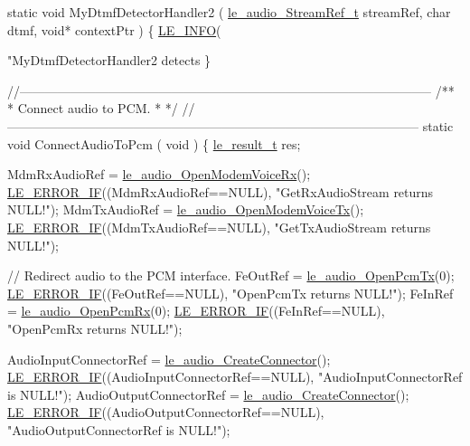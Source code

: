 \begin{DoxyCodeInclude}
{{{\textcolor{keyword}{static} \textcolor{keywordtype}{void} MyDtmfDetectorHandler2
(
    \hyperlink{le__audio__interface_8h_a9a46ff5a5afa61f1bc76120ab9e4da0a}{le\_audio\_StreamRef\_t} streamRef,
    \textcolor{keywordtype}{char}  dtmf,
    \textcolor{keywordtype}{void}* contextPtr
)
\{
    \hyperlink{le__log_8h_a23e6d206faa64f612045d688cdde5808}{LE\_INFO}(\textcolor{stringliteral}{"MyDtmfDetectorHandler2 detects %
\}

\textcolor{comment}{//--------------------------------------------------------------------------------------------------}\textcolor{comment}{}
\textcolor{comment}{/**}
\textcolor{comment}{ * Connect audio to PCM.}
\textcolor{comment}{ *}
\textcolor{comment}{ */}
\textcolor{comment}{//--------------------------------------------------------------------------------------------------}
\textcolor{keyword}{static} \textcolor{keywordtype}{void} ConnectAudioToPcm
(
    \textcolor{keywordtype}{void}
)
\{
    \hyperlink{le__basics_8h_a1cca095ed6ebab24b57a636382a6c86c}{le\_result\_t} res;

    MdmRxAudioRef = \hyperlink{le__audio__interface_8h_ae3ed568ba4d2763ea77e17e77b20ff02}{le\_audio\_OpenModemVoiceRx}();
    \hyperlink{le__log_8h_aceaf11a11691d6c676e36dd317b38dbd}{LE\_ERROR\_IF}((MdmRxAudioRef==NULL), \textcolor{stringliteral}{"GetRxAudioStream returns NULL!"});
    MdmTxAudioRef = \hyperlink{le__audio__interface_8h_ad745f008bb04873c817da7af3daf783d}{le\_audio\_OpenModemVoiceTx}();
    \hyperlink{le__log_8h_aceaf11a11691d6c676e36dd317b38dbd}{LE\_ERROR\_IF}((MdmTxAudioRef==NULL), \textcolor{stringliteral}{"GetTxAudioStream returns NULL!"});

    \textcolor{comment}{// Redirect audio to the PCM interface.}
    FeOutRef = \hyperlink{le__audio__interface_8h_a5e112543e8525775aa670dc71b320766}{le\_audio\_OpenPcmTx}(0);
    \hyperlink{le__log_8h_aceaf11a11691d6c676e36dd317b38dbd}{LE\_ERROR\_IF}((FeOutRef==NULL), \textcolor{stringliteral}{"OpenPcmTx returns NULL!"});
    FeInRef = \hyperlink{le__audio__interface_8h_aa0f0b5fcab8844c67a936d88fa050cf5}{le\_audio\_OpenPcmRx}(0);
    \hyperlink{le__log_8h_aceaf11a11691d6c676e36dd317b38dbd}{LE\_ERROR\_IF}((FeInRef==NULL), \textcolor{stringliteral}{"OpenPcmRx returns NULL!"});

    AudioInputConnectorRef = \hyperlink{le__audio__interface_8h_a570aaf85086f00aca592acfbaaa237be}{le\_audio\_CreateConnector}();
    \hyperlink{le__log_8h_aceaf11a11691d6c676e36dd317b38dbd}{LE\_ERROR\_IF}((AudioInputConnectorRef==NULL), \textcolor{stringliteral}{"AudioInputConnectorRef is NULL!"});
    AudioOutputConnectorRef = \hyperlink{le__audio__interface_8h_a570aaf85086f00aca592acfbaaa237be}{le\_audio\_CreateConnector}();
    \hyperlink{le__log_8h_aceaf11a11691d6c676e36dd317b38dbd}{LE\_ERROR\_IF}((AudioOutputConnectorRef==NULL), \textcolor{stringliteral}{"AudioOutputConnectorRef is NULL!"});

}}}}
\end{DoxyCodeInclude}
